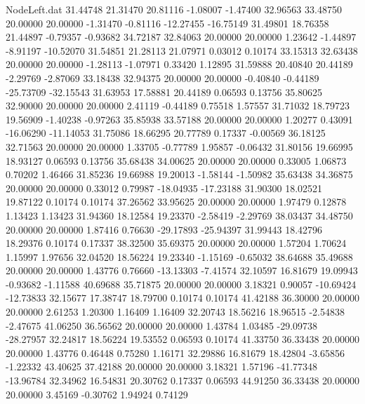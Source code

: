 \begin{filecontents}{NodeLeft.dat}
  31.44748   21.31470   20.81116    -1.08007   -1.47400   32.96563   33.48750   20.00000   20.00000   -1.31470   -0.81116  -12.27455  -16.75149
  31.49801   18.76358   21.44897    -0.79357   -0.93682   34.72187   32.84063   20.00000   20.00000    1.23642   -1.44897   -8.91197  -10.52070
  31.54851   21.28113   21.07971     0.03012    0.10174   33.15313   32.63438   20.00000   20.00000   -1.28113   -1.07971    0.33420    1.12895
  31.59888   20.40840   20.44189    -2.29769   -2.87069   33.18438   32.94375   20.00000   20.00000   -0.40840   -0.44189  -25.73709  -32.15543
  31.63953   17.58881   20.44189     0.06593    0.13756   35.80625   32.90000   20.00000   20.00000    2.41119   -0.44189    0.75518    1.57557
  31.71032   18.79723   19.56909    -1.40238   -0.97263   35.85938   33.57188   20.00000   20.00000    1.20277    0.43091  -16.06290  -11.14053
  31.75086   18.66295   20.77789     0.17337   -0.00569   36.18125   32.71563   20.00000   20.00000    1.33705   -0.77789    1.95857   -0.06432
  31.80156   19.66995   18.93127     0.06593    0.13756   35.68438   34.00625   20.00000   20.00000    0.33005    1.06873    0.70202    1.46466
  31.85236   19.66988   19.20013    -1.58144   -1.50982   35.63438   34.36875   20.00000   20.00000    0.33012    0.79987  -18.04935  -17.23188
  31.90300   18.02521   19.87122     0.10174    0.10174   37.26562   33.95625   20.00000   20.00000    1.97479    0.12878    1.13423    1.13423
  31.94360   18.12584   19.23370    -2.58419   -2.29769   38.03437   34.48750   20.00000   20.00000    1.87416    0.76630  -29.17893  -25.94397
  31.99443   18.42796   18.29376     0.10174    0.17337   38.32500   35.69375   20.00000   20.00000    1.57204    1.70624    1.15997    1.97656
  32.04520   18.56224   19.23340    -1.15169   -0.65032   38.64688   35.49688   20.00000   20.00000    1.43776    0.76660  -13.13303   -7.41574
  32.10597   16.81679   19.09943    -0.93682   -1.11588   40.69688   35.71875   20.00000   20.00000    3.18321    0.90057  -10.69424  -12.73833
  32.15677   17.38747   18.79700     0.10174    0.10174   41.42188   36.30000   20.00000   20.00000    2.61253    1.20300    1.16409    1.16409
  32.20743   18.56216   18.96515    -2.54838   -2.47675   41.06250   36.56562   20.00000   20.00000    1.43784    1.03485  -29.09738  -28.27957
  32.24817   18.56224   19.53552     0.06593    0.10174   41.33750   36.33438   20.00000   20.00000    1.43776    0.46448    0.75280    1.16171
  32.29886   16.81679   18.42804    -3.65856   -1.22332   43.40625   37.42188   20.00000   20.00000    3.18321    1.57196  -41.77348  -13.96784
  32.34962   16.54831   20.30762     0.17337    0.06593   44.91250   36.33438   20.00000   20.00000    3.45169   -0.30762    1.94924    0.74129

\end{filecontents}
